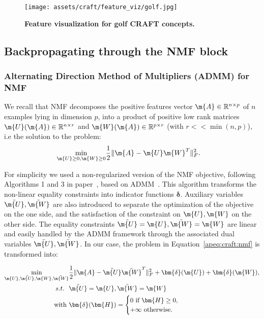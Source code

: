 \begin{figure}[ht]
\centering
  \texttt{[image: assets/craft/feature\_viz/golf.jpg]}
  \caption{ \textbf{Feature visualization for golf CRAFT concepts.} 
  }
  \label{fig:craft:feature_viz_golf}
\end{figure}

\clearpage
\newpage






\subsection{Backpropagating through the NMF block}

\subsubsection{Alternating Direction Method of Multipliers (ADMM) for NMF}

We recall that NMF decomposes the positive features vector $\m{A} \in \mathbb{R}^{n \times p}$ of $n$ examples lying in dimension $p$, into a product of positive low rank matrices $\m{U}(\m{A})\in\mathbb{R}^{n\times r}$ and $\m{W}(\m{A})\in\mathbb{R}^{p\times r}$ (with $r<<\min(n,p)$), i.e the solution to the problem:
\begin{align}\label{apeq:craft:nmf}
\min_{\m{U}\geq 0,\m{W}\geq 0} & \frac{1}{2}\|\m{A}-\m{U}\m{W}^T\|^2_F. %
\end{align}

For simplicity we used a non-regularized version of the NMF objective, following Algorithms 1 and 3 in paper~\cite{huang2016flexible}, based on ADMM~\cite{boyd2011distributed}. This algorithm transforms the non-linear equality constraints into indicator functions $\bm{\delta}$. Auxiliary variables $\tilde{\m{U}},\tilde{\m{W}}$ are also introduced to separate the optimization of the objective on the one side, and the satisfaction of the constraint on $\m{U}, \m{W}$ on the other side. The equality constraints $\tilde{\m{U}}=\m{U},\tilde{\m{W}}=\m{W}$ are linear and easily handled by the ADMM framework through the associated dual variables $\bar{\m{U}},\bar{\m{W}}$. In our case, the problem in Equation~\ref{apeq:craft:nmf} is transformed into:
  
\begin{equation}
\begin{aligned}\label{apeq:craft:admm}
\min_{\m{U},\tilde{\m{U}}, \m{W},\tilde{\m{W}}} & \frac{1}{2}\|\m{A}-\tilde{\m{U}} \tilde{\m{W}}^T\|^2_F+\bm{\delta}(\m{U})+\bm{\delta}(\m{W}), 
\\%
~ ~ s.t. ~ ~ &\tilde{\m{U}}=\m{U}, \tilde{\m{W}}=\m{W} \\
     \text{with} ~ & \bm{\delta}(\bm{H})=\begin{cases}
                            0 \text{ if } \bm{H} \geq 0,\\
                            +\infty \text{ otherwise.}
                            \end{cases}
\end{aligned}
\end{equation}

